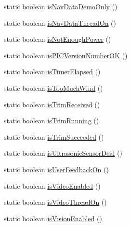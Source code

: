 \begin{DoxyCompactItemize}
\item 
static boolean \hyperlink{classworkspace_1_1_a_r_drone_nav_data_1_1src_1_1_nav_data_a445bb7c376a59670e13996a9b31a7b1b}{is\+Nav\+Data\+Demo\+Only} ()
\item 
static boolean \hyperlink{classworkspace_1_1_a_r_drone_nav_data_1_1src_1_1_nav_data_a7ef8a51d3682392b97b4f42b3e9258d9}{is\+Nav\+Data\+Thread\+On} ()
\item 
static boolean \hyperlink{classworkspace_1_1_a_r_drone_nav_data_1_1src_1_1_nav_data_a8abcab1f0f0baf9206be6166cd96bc0e}{is\+Not\+Enough\+Power} ()
\item 
static boolean \hyperlink{classworkspace_1_1_a_r_drone_nav_data_1_1src_1_1_nav_data_ab3187c2772f92a762c2737f36102847d}{is\+P\+I\+C\+Version\+Number\+O\+K} ()
\item 
static boolean \hyperlink{classworkspace_1_1_a_r_drone_nav_data_1_1src_1_1_nav_data_a89924ac03c919f1fb0cebfc7ce625a82}{is\+Timer\+Elapsed} ()
\item 
static boolean \hyperlink{classworkspace_1_1_a_r_drone_nav_data_1_1src_1_1_nav_data_a016f05eda553c1e38db797bf12908698}{is\+Too\+Much\+Wind} ()
\item 
static boolean \hyperlink{classworkspace_1_1_a_r_drone_nav_data_1_1src_1_1_nav_data_a3fd9cfc565564a06d686c60e08f68b80}{is\+Trim\+Received} ()
\item 
static boolean \hyperlink{classworkspace_1_1_a_r_drone_nav_data_1_1src_1_1_nav_data_a3efe966aaeff111f915dad8d449d7326}{is\+Trim\+Running} ()
\item 
static boolean \hyperlink{classworkspace_1_1_a_r_drone_nav_data_1_1src_1_1_nav_data_a2dff4b67e1e097bdf8cfd184df21631d}{is\+Trim\+Succeeded} ()
\item 
static boolean \hyperlink{classworkspace_1_1_a_r_drone_nav_data_1_1src_1_1_nav_data_a548cbe83a0873553a2b4a9e06a24548e}{is\+Ultrasonic\+Sensor\+Deaf} ()
\item 
static boolean \hyperlink{classworkspace_1_1_a_r_drone_nav_data_1_1src_1_1_nav_data_acdb0f28cc0b9050bf83fb94536fdaf6f}{is\+User\+Feedback\+On} ()
\item 
static boolean \hyperlink{classworkspace_1_1_a_r_drone_nav_data_1_1src_1_1_nav_data_ae34e18af05d69ba880942068ae15595a}{is\+Video\+Enabled} ()
\item 
static boolean \hyperlink{classworkspace_1_1_a_r_drone_nav_data_1_1src_1_1_nav_data_ab18482070ef9852328e007a5d261c7c2}{is\+Video\+Thread\+On} ()
\item 
static boolean \hyperlink{classworkspace_1_1_a_r_drone_nav_data_1_1src_1_1_nav_data_ae4a5533beec5ccfa0a62b66ab485d93d}{is\+Vision\+Enabled} ()

\end{DoxyCompactItemize}
